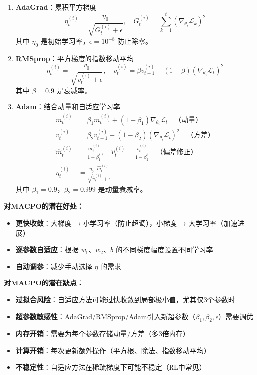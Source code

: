 \documentclass[11pt,a3paper]{ctexart}
\begin{document}
\begin{enumerate}
    \item \textbf{AdaGrad}：累积平方梯度
    \begin{equation}
    \eta_t^{(i)} = \frac{\eta_0}{\sqrt{G_t^{(i)} + \epsilon}}, \quad G_t^{(i)} = \sum_{k=1}^{t} (\nabla_{\theta_i} \mathcal{L}_k)^2
    \end{equation}
    其中 $\eta_0$ 是初始学习率，$\epsilon = 10^{-8}$ 防止除零。
    
    \item \textbf{RMSprop}：平方梯度的指数移动平均
    \begin{equation}
    \eta_t^{(i)} = \frac{\eta_0}{\sqrt{v_t^{(i)} + \epsilon}}, \quad v_t^{(i)} = \beta v_{t-1}^{(i)} + (1-\beta)(\nabla_{\theta_i} \mathcal{L}_t)^2
    \end{equation}
    其中 $\beta = 0.9$ 是衰减率。
    
    \item \textbf{Adam}：结合动量和自适应学习率
    \begin{align}
    m_t^{(i)} &= \beta_1 m_{t-1}^{(i)} + (1-\beta_1)\nabla_{\theta_i} \mathcal{L}_t \quad \text{（动量）} \\
    v_t^{(i)} &= \beta_2 v_{t-1}^{(i)} + (1-\beta_2)(\nabla_{\theta_i} \mathcal{L}_t)^2 \quad \text{（方差）} \\
    \hat{m}_t^{(i)} &= \frac{m_t^{(i)}}{1-\beta_1^t}, \quad \hat{v}_t^{(i)} = \frac{v_t^{(i)}}{1-\beta_2^t} \quad \text{（偏差修正）} \\
    \eta_t^{(i)} &= \frac{\eta_0 \cdot \hat{m}_t^{(i)}}{\sqrt{\hat{v}_t^{(i)}} + \epsilon}
    \end{align}
    其中 $\beta_1 = 0.9$，$\beta_2 = 0.999$ 是动量衰减率。
\end{enumerate}

\textbf{对MACPO的潜在好处：}
\begin{itemize}
    \item \textbf{更快收敛}：大梯度 → 小学习率（防止超调），小梯度 → 大学习率（加速进展）
    \item \textbf{逐参数自适应}：根据 $w_1$、$w_2$、$b$ 的不同梯度幅度设置不同学习率
    \item \textbf{自动调参}：减少手动选择 $\eta$ 的需求
\end{itemize}

\textbf{对MACPO的潜在缺点：}
\begin{itemize}
    \item \textbf{过拟合风险}：自适应方法可能过快收敛到局部极小值，尤其仅3个参数时
    \item \textbf{超参数敏感性}：AdaGrad/RMSprop/Adam引入新超参数（$\beta_1, \beta_2, \epsilon$）需要调优
    \item \textbf{内存开销}：需要为每个参数存储动量/方差（多3倍内存）
    \item \textbf{计算开销}：每次更新额外操作（平方根、除法、指数移动平均）
    \item \textbf{不稳定性}：自适应方法在稀疏梯度下可能不稳定（RL中常见）
\end{itemize}
\end{document}
